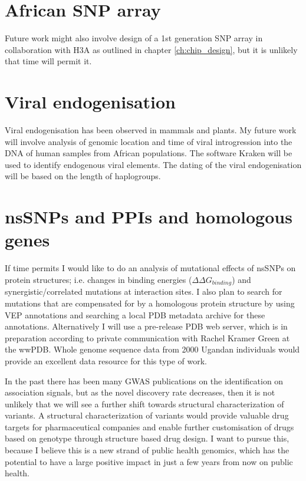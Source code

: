 \section{African SNP array}
Future work might also involve design of a 1st generation SNP array in collaboration with \gls{H3A} as outlined in chapter \ref{ch:chip_design}, but it is unlikely that time will permit it.

\section{Viral endogenisation}
Viral endogenisation has been observed in mammals\cite{Horie2010} and plants\cite{10.1371/journal.ppat.1002146}. My future work will involve analysis of genomic location and time of viral introgression into the DNA of human samples from African populations. The software Kraken\cite{24580807} will be used to identify endogenous viral elements. The dating of the viral endogenisation will be based on the length of haplogroups.

\section{\glspl{nsSNP} and \glspl{PPI} and homologous genes}
If time permits I would like to do an analysis of mutational effects of nsSNPs on protein structures; i.e. changes in binding energies ($\Delta \Delta G_{binding}$) and synergistic/correlated mutations at interaction sites. I also plan to search for mutations that are compensated for by a homologous protein structure by using \gls{VEP} annotations and searching a local \gls{PDB} metadata archive for these annotations. Alternatively I will use a pre-release \gls{PDB} web server, which is in preparation according to private communication with Rachel Kramer Green at the \gls{wwPDB}. Whole genome sequence data from 2000 Ugandan individuals would provide an excellent data resource for this type of work.

In the past there has been many \gls{GWAS} publications on the identification on association signals, but as the novel discovery rate decreases, then it is not unlikely that we will see a further shift towards structural characterization of variants.\cite{Teng2009}\cite{Kucukkal201518} A structural characterization of variants would provide valuable drug targets for pharmaceutical companies and enable further customisation of drugs based on genotype through structure based drug design.\cite{Kuntz21081992} I want to pursue this, because I believe this is a new strand of public health genomics, which has the potential to have a large positive impact in just a few years from now on public health.